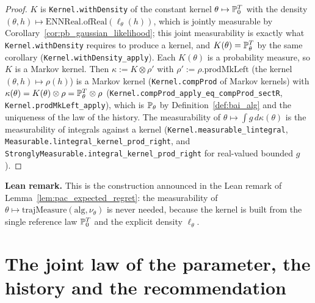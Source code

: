 \begin{proof}
\leanok
{}
$K$ is \texttt{Kernel.withDensity} of the constant kernel $\theta\mapsto\mathbb{P}_0^T$ with the
density $(\theta,h)\mapsto\mathrm{ENNReal.ofReal}(\ell_\theta(h))$, which is jointly measurable
by Corollary~\ref{cor:pb_gaussian_likelihood}; this joint measurability is exactly what
\texttt{Kernel.withDensity} requires to produce a kernel, and $K(\theta) = \mathbb{P}_\theta^T$ by
the same corollary (\texttt{Kernel.withDensity\_apply}). Each $K(\theta)$ is a probability
measure, so $K$ is a Markov kernel. Then $\kappa := K\otimes\rho'$ with
$\rho' := \rho.\mathrm{prodMkLeft}$ (the kernel $(\theta,h)\mapsto\rho(h)$) is a Markov kernel
(\texttt{Kernel.compProd} of Markov kernels) with
$\kappa(\theta) = K(\theta)\otimes\rho = \mathbb{P}_\theta^T\otimes\rho$
(\texttt{Kernel.compProd\_apply\_eq\_compProd\_sectR}, \texttt{Kernel.prodMkLeft\_apply}),
which is $\mathbb{P}_\theta$ by Definition~\ref{def:bai_alg} and the uniqueness of the law of the
history. The measurability of $\theta\mapsto\int g\,d\kappa(\theta)$ is the measurability of
integrals against a kernel (\texttt{Kernel.measurable\_lintegral},
\texttt{Measurable.lintegral\_kernel\_prod\_right}, and
\texttt{StronglyMeasurable.integral\_kernel\_prod\_right} for real-valued bounded $g$).
\end{proof}

\textbf{Lean remark.} This is the construction announced in the Lean remark of
Lemma~\ref{lem:pac_expected_regret}: the measurability of
$\theta\mapsto\mathrm{trajMeasure}(\mathrm{alg},\nu_\theta)$ is never needed, because the kernel
is built from the single reference law $\mathbb{P}_0^T$ and the explicit density $\ell_\theta$.

\section{The joint law of the parameter, the history and the recommendation}
\label{sec:pre_bayes_joint}

